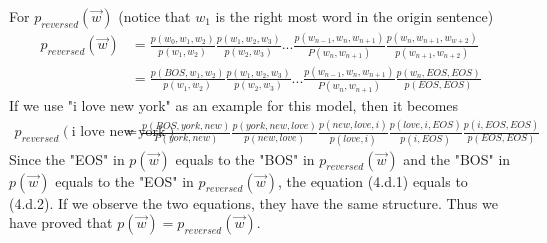 \documentclass{article}
\begin{document}
\noindent
For $p_{reversed}(\vec{w})$ (notice that $w_1$ is the right most word in the origin sentence)
\begin{align*}
    p_{reversed}(\vec{w})
    &= \frac{p(w_0, w_1, w_2)}{p(w_1, w_2)}
       \frac{p(w_1, w_2, w_3)}{p(w_2, w_3)}...
       \frac{p(w_{n-1}, w_n, w_{n+1})}{P(w_n, w_{n+1})}
       \frac{p(w_n, w_{n+1}, w_{w+2})}{p(w_{n+1}, w_{n+2})}
    \\&= \frac{p(BOS, w_1, w_2)}{p(w_1, w_2)}
       \frac{p(w_1, w_2, w_3)}{p(w_2, w_3)}...
       \frac{p(w_{n-1}, w_n, w_{n+1})}{P(w_n, w_{n+1})}
       \frac{p(w_n, EOS, EOS)}{p(EOS, EOS)}
\end{align*}
If we use "i love new york" as an example for this model, then it becomes\\
\begin{align*}
    p_{reversed}(\text{i love new york})
    &= \frac{p(BOS, york, new)}{P(york, new)}
       \frac{p(york, new, love)}{p(new, love)}
       \frac{p(new, love, i)}{p(love, i)}
       \frac{p(love, i, EOS)}{p(i, EOS)}
       \frac{p(i, EOS, EOS)}{p(EOS, EOS)}       \tag{4.d.2}
\end{align*}
Since the "EOS" in $p(\vec{w})$ equals to the "BOS" in $p_{reversed}(\vec{w})$ and the "BOS" in $p(\vec{w})$ equals to the "EOS" in $p_{reversed}(\vec{w})$, the equation (4.d.1) equals to (4.d.2). If we observe the two equations, they have the same structure. Thus we have proved that $p(\vec{w}) = p_{reversed}(\vec{w})$.\\
\end{document}
